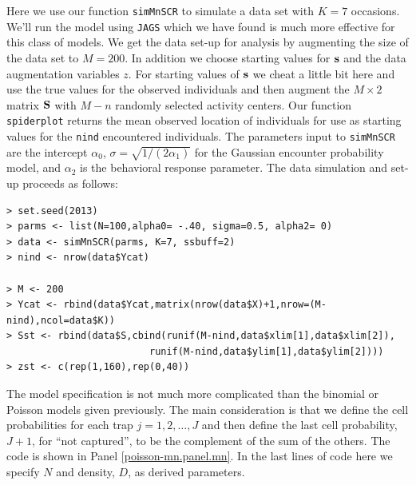Here we use our function \mbox{\tt simMnSCR} to simulate a data set
with $K=7$ occasions.
We'll run the model using \mbox{\tt JAGS}
which we have found is much more effective for this class of models.
We get the data set-up for analysis by augmenting the size of the data
set to $M=200$. In addition we choose starting values for ${\bf s}$
and the data augmentation variables $z$.  For starting values of ${\bf
  s}$ we cheat a little bit here and use the true values for the
observed individuals and then augment the $M \times 2$ matrix ${\bf
  S}$ with $M-n$ randomly selected activity centers. Our function
\mbox{\tt spiderplot} returns the mean observed location of
individuals for use as starting values for the \mbox{\tt nind}
encountered individuals.  The parameters input to
\mbox{\tt simMnSCR} are the intercept $\alpha_{0}$, $\sigma =
\sqrt{1/(2\alpha_{1})}$ for the Gaussian encounter probability model,
and $\alpha_{2}$ is the behavioral response parameter. The data
simulation and set-up proceeds as follows:
{\small
\begin{verbatim}
> set.seed(2013)
> parms <- list(N=100,alpha0= -.40, sigma=0.5, alpha2= 0)
> data <- simMnSCR(parms, K=7, ssbuff=2)
> nind <- nrow(data$Ycat)

> M <- 200
> Ycat <- rbind(data$Ycat,matrix(nrow(data$X)+1,nrow=(M-nind),ncol=data$K))
> Sst <- rbind(data$S,cbind(runif(M-nind,data$xlim[1],data$xlim[2]),
                         runif(M-nind,data$ylim[1],data$ylim[2])))
> zst <- c(rep(1,160),rep(0,40))
\end{verbatim}
}


The model specification is not much more complicated than the binomial
or Poisson models given previously. The main consideration is that we
define the cell probabilities for each trap $j=1,2,\dots,J$ and then
define the last cell probability, $J+1$, for ``not captured'', to be
the complement of the sum of the others. The code is shown in Panel
\ref{poisson-mn.panel.mn}.  In the last lines of code here we specify
$N$ and density, $D$, as derived parameters.

